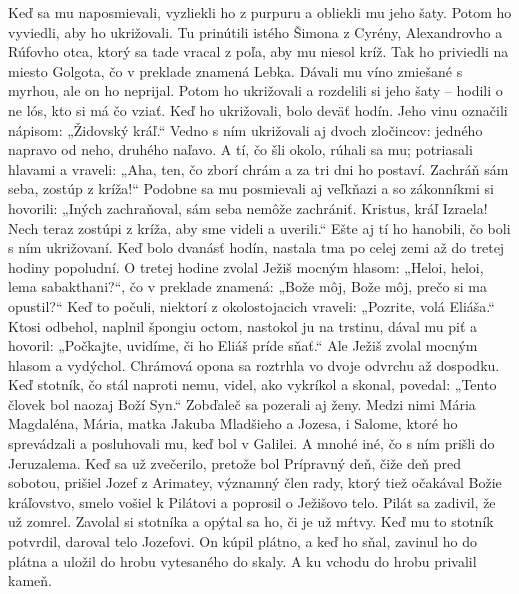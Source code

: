 Keď sa mu naposmievali, vyzliekli ho z purpuru a obliekli mu jeho šaty. Potom ho vyviedli, aby ho ukrižovali.
\versseparator
Tu prinútili istého Šimona z Cyrény, Alexandrovho a Rúfovho otca, ktorý sa tade vracal z poľa, aby mu niesol kríž. Tak ho priviedli na miesto Golgota, čo v preklade znamená Lebka.
Dávali mu víno zmiešané s myrhou, ale on ho neprijal.
Potom ho ukrižovali a rozdelili si jeho šaty – hodili o ne lós, kto si má čo vziať.
\versseparator
Keď ho ukrižovali, bolo deväť hodín. Jeho vinu označili nápisom: „Židovský kráľ.“ Vedno s ním ukrižovali aj dvoch zločincov: jedného napravo od neho, druhého naľavo.
\versseparator
A tí, čo šli okolo, rúhali sa mu; potriasali hlavami a vraveli: „Aha, ten, čo zborí chrám a za tri dni ho postaví. Zachráň sám seba, zostúp z kríža!“ Podobne sa mu posmievali aj veľkňazi a so zákonníkmi si hovorili: „Iných zachraňoval, sám seba nemôže zachrániť. Kristus, kráľ Izraela! Nech teraz zostúpi z kríža, aby sme videli a uverili.“ Ešte aj tí ho hanobili, čo boli s ním ukrižovaní.
\versseparator
Keď bolo dvanásť hodín, nastala tma po celej zemi až do tretej hodiny popoludní. O tretej hodine zvolal Ježiš mocným hlasom: „Heloi, heloi, lema sabakthani?“, čo v preklade znamená: „Bože môj, Bože môj, prečo si ma opustil?“ Keď to počuli, niektorí z okolostojacich vraveli: „Pozrite, volá Eliáša.“
Ktosi odbehol, naplnil špongiu octom, nastokol ju na trstinu, dával mu piť a hovoril: „Počkajte, uvidíme, či ho Eliáš príde sňať.“ Ale Ježiš zvolal mocným hlasom a vydýchol.
\versseparator
Chrámová opona sa roztrhla vo dvoje odvrchu až dospodku. Keď stotník, čo stál naproti nemu, videl, ako vykríkol a skonal, povedal: „Tento človek bol naozaj Boží Syn.“
\versseparator
Zobďaleč sa pozerali aj ženy. Medzi nimi Mária Magdaléna, Mária, matka Jakuba Mladšieho a Jozesa, i Salome, ktoré ho sprevádzali a posluhovali mu, keď bol v Galilei. A mnohé iné, čo s ním prišli do Jeruzalema.
Keď sa už zvečerilo, pretože bol Prípravný deň, čiže deň pred sobotou, prišiel Jozef z Arimatey, významný člen rady, ktorý tiež očakával Božie kráľovstvo, smelo vošiel k Pilátovi a poprosil o Ježišovo telo.
Pilát sa zadivil, že už zomrel. Zavolal si stotníka a opýtal sa ho, či je už mŕtvy. Keď mu to stotník potvrdil, daroval telo Jozefovi. On kúpil plátno, a keď ho sňal, zavinul ho do plátna a uložil do hrobu vytesaného do skaly. A ku vchodu do hrobu privalil kameň. 